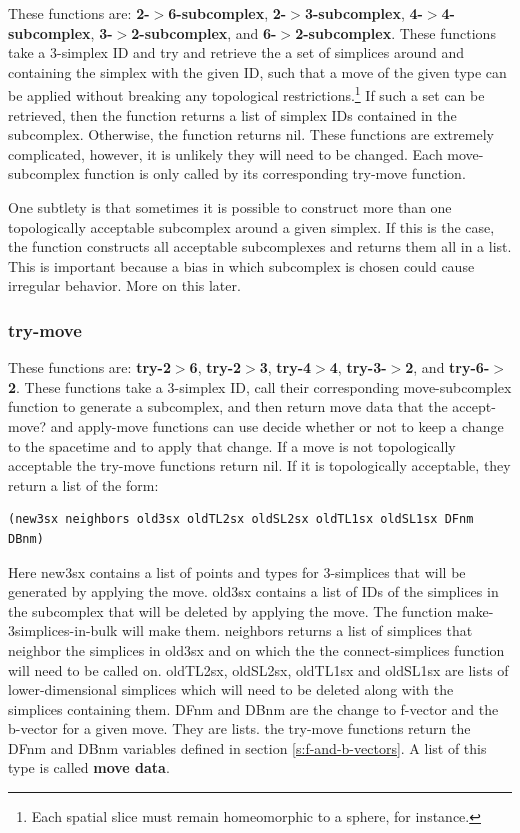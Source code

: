 \documentclass[12pt]{article}
\begin{document}
These functions are: \textbf{2-$>$6-subcomplex},
\textbf{2-$>$3-subcomplex}, \textbf{4-$>$4-subcomplex},
\textbf{3-$>$2-subcomplex}, and \textbf{6-$>$2-subcomplex}. These
functions take a 3-simplex ID and try and retrieve the a set of
simplices around and containing the simplex with the given ID, such
that a move of the given type can be applied without breaking any
topological restrictions.\footnote{Each spatial slice must remain
  homeomorphic to a sphere, for instance.} If such a set can be
retrieved, then the function returns a list of simplex IDs contained
in the subcomplex. Otherwise, the function returns nil. These
functions are extremely complicated, however, it is unlikely they will
need to be changed. Each move-subcomplex function is only called by
its corresponding try-move function.

One subtlety is that sometimes it is possible to construct more than
one topologically acceptable subcomplex around a given simplex. If
this is the case, the function constructs all acceptable subcomplexes
and returns them all in a list. This is important because a bias in
which subcomplex is chosen could cause irregular behavior. More on
this later.

\subsubsection{try-move}

These functions are: \textbf{try-2$>$6}, \textbf{try-2$>$3},
\textbf{try-4$>$4}, \textbf{try-3-$>$2}, and
\textbf{try-6-$>$2}. These functions take a 3-simplex ID, call their
corresponding move-subcomplex function to generate a subcomplex, and
then return move data that the accept-move? and apply-move functions
can use decide whether or not to keep a change to the spacetime and to
apply that change. If a move is not topologically acceptable the
try-move functions return nil. If it is topologically acceptable, they
return a list of the form:
\begin{small}
\begin{lstlisting}
(new3sx neighbors old3sx oldTL2sx oldSL2sx oldTL1sx oldSL1sx DFnm DBnm)
\end{lstlisting}
\end{small}
Here new3sx contains a list of points and types for 3-simplices that
will be generated by applying the move. old3sx contains a list of IDs
of the simplices in the subcomplex that will be deleted by applying
the move. The function make-3simplices-in-bulk will make
them. neighbors returns a list of simplices that neighbor the
simplices in old3sx and on which the the connect-simplices function
will need to be called on. oldTL2sx, oldSL2sx, oldTL1sx and oldSL1sx
are lists of lower-dimensional simplices which will need to be deleted
along with the simplices containing them. DFnm and DBnm are the change
to f-vector and the b-vector for a given move. They are lists. the
try-move functions return the DFnm and DBnm variables defined in
section \ref{s:f-and-b-vectors}. A list of this type is called
\textbf{move data}.
\end{document}
